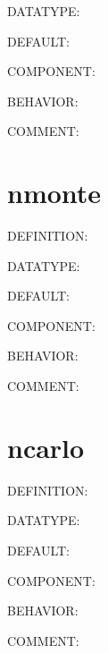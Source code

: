 {\color{green}DATATYPE:}

{\color{blue}DEFAULT:}

{\color{brown}COMPONENT:}

{\color{purple}BEHAVIOR:}

{\color{olive}COMMENT:}

\section{nmonte}
{\color{red}DEFINITION:}

{\color{green}DATATYPE:}

{\color{blue}DEFAULT:}

{\color{brown}COMPONENT:}

{\color{purple}BEHAVIOR:}

{\color{olive}COMMENT:}

\section{ncarlo}
{\color{red}DEFINITION:}

{\color{green}DATATYPE:}

{\color{blue}DEFAULT:}

{\color{brown}COMPONENT:}

{\color{purple}BEHAVIOR:}

{\color{olive}COMMENT:}
